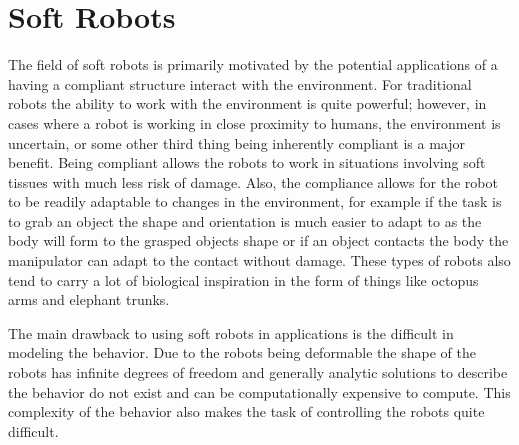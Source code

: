 \documentclass[letterpaper, 10 pt, conference]{ieeeconf}  %
\begin{document}
\begin{comment}
Motivation for soft robot applications (adaptable, uncertainty, safer, biological study)

complexities due to being continuous and deformable (infinite degrees of freedom, lack of analytic solution, wide range of motions)

lack of real-time control (dynamics computationally intensive, accuracy issues)

uses of machine learning in soft robots (applied to inverse kinematics, learning dynamics and trajectory optimization, disturbance rejection, short time-horizon learning?)

applications of machine learning to control problems (reinforcement learning for tasks)

difficulties of reinforcement learning (non-markov, continuous action space, continuous goal space, various possible goals, sample efficiency?)

what we are doing (applications of reinforcement learning to dynamic control trained on simulations)
\end{comment}

\section{Soft Robots}

The field of soft robots is primarily motivated by the potential applications of a having a compliant structure interact with the environment. For traditional robots the ability to work with the environment is quite powerful; however, in cases where a robot is working in close proximity to humans, the environment is uncertain, or some other third thing being inherently compliant is a major benefit. Being compliant allows the robots to work in situations involving soft tissues with much less risk of damage. Also, the compliance allows for the robot to be readily adaptable to changes in the environment, for example if the task is to grab an object the shape and orientation is much easier to adapt to as the body will form to the grasped objects shape or if an object contacts the body the manipulator can adapt to the contact without damage. These types of robots also tend to carry a lot of biological inspiration in the form of things like octopus arms and elephant trunks.

The main drawback to using soft robots in applications is the difficult in modeling the behavior. Due to the robots being deformable the shape of the robots has infinite degrees of freedom and generally analytic solutions to describe the behavior do not exist and can be computationally expensive to compute. This complexity of the behavior also makes the task of controlling the robots quite difficult. 
\end{document}
